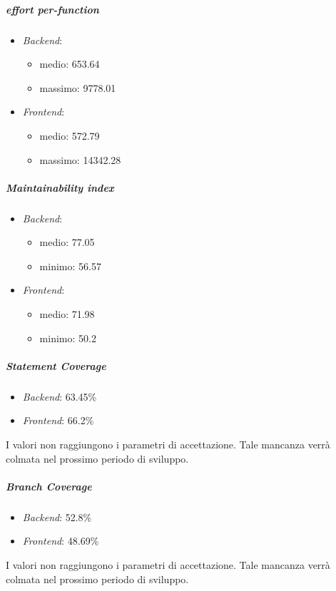 	\subparagraph{ effort per-function}
	\begin{itemize}
		\item \emph{Backend}: 
		\begin{itemize}
			\item medio: 653.64
			\item massimo: 9778.01
		\end{itemize}
		\item \emph{Frontend}: 
		\begin{itemize}
			\item medio: 572.79
			\item massimo: 14342.28
		\end{itemize} 
	\end{itemize}


	\subparagraph{Maintainability index}
	\begin{itemize}
		\item \emph{Backend}: 
		\begin{itemize}
			\item medio: 77.05
			\item minimo: 56.57
		\end{itemize} 
		\item \emph{Frontend}: 
		\begin{itemize}
			\item medio: 71.98
			\item minimo: 50.2
		\end{itemize} 
	\end{itemize}


	\subparagraph{Statement Coverage}
	\begin{itemize}
		\item \emph{Backend}: 63.45\%
		\item \emph{Frontend}: 66.2\%
	\end{itemize}
	
	I valori non raggiungono i parametri di accettazione. Tale mancanza verrà colmata nel prossimo periodo di sviluppo.

	\subparagraph{Branch Coverage}
	\begin{itemize}
		\item \emph{Backend}: 52.8\%
		\item \emph{Frontend}: 48.69\%
	\end{itemize}

	I valori non raggiungono i parametri di accettazione. Tale mancanza verrà colmata nel prossimo periodo di sviluppo.
	



